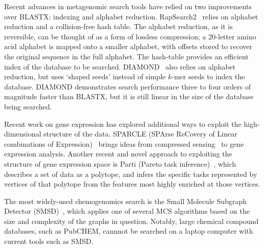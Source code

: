 \documentclass{acm_proc_article-sp}
\begin{document}
Recent advances in metagenomic search tools have relied on two improvements over
BLASTX: indexing and alphabet reduction.
RapSearch2~\cite{zhao2012rapsearch2} relies on alphabet reduction and a 
collision-free hash table.
The alphabet reduction, as it is reversible, can be thought of as a form of
lossless compression; a 20-letter amino acid alphabet is mapped onto a smaller
alphabet, with offsets stored to recover the original sequence in the full
alphabet.
The hash-table provides an efficient index of the database to be searched.
DIAMOND~\cite{buchfink2014fast} also relies on alphabet reduction, but uses
`shaped seeds' instead of simple $k$-mer seeds to index the database.
DIAMOND demonstrates search performance three to four orders of magnitude faster
than BLASTX, but it is still linear in the size of the database being searched.

Recent work on gene expression has explored additional ways to exploit the high-dimensional 
structure of the data.
SPARCLE (SPArse ReCovery of Linear combinations of Expression)~\cite{prat2011recovering}
brings ideas from compressed sensing~\cite{candes2005decoding} 
to gene expression analysis.
Another recent and novel approach to exploiting the structure of gene expression
space is Parti (Pareto task inference)~\cite{hart2015inferring}, which describes a set of
data as a polytope, and infers the specific tasks represented by vertices of
that polytope from the features most highly enriched at those vertices.

The most widely-used chemogenomics search is the Small Molecule Subgraph Detector 
(SMSD)~\cite{rahman2009small}, which applies one of several MCS algorithms based
on the size and complexity of the graphs in question.
Notably, large chemical compound databases, such as PubCHEM,
cannnot be searched on a laptop computer with current tools such as SMSD.
\end{document}
